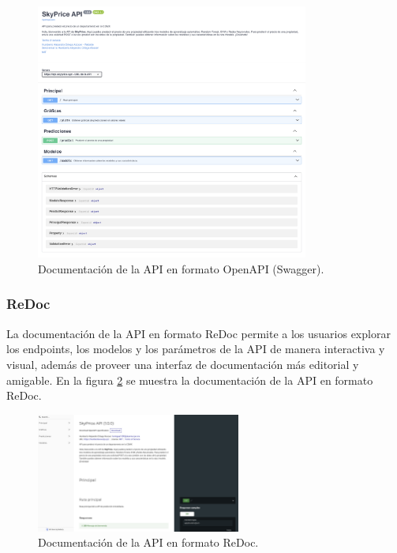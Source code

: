 \begin{figure}[H]
    \centering
    \includegraphics[width=0.8\textwidth]{imagenes/05-implementacion/servicio-web/openapi.png}
    \caption{Documentación de la API en formato OpenAPI (Swagger).}
    \label{fig:skyprice-openapi}
\end{figure}

\subsubsection{ReDoc}
La documentación de la API en formato ReDoc permite a los usuarios explorar los
endpoints, los modelos y los parámetros de la API de manera interactiva y visual,
además de proveer una interfaz de documentación más editorial y amigable. En la
figura \ref{fig:skyprice-redoc} se muestra la documentación de la API en formato
ReDoc.

\begin{figure}[H]
    \centering
    \includegraphics[width=0.6\textwidth]{imagenes/05-implementacion/servicio-web/redoc.png}
    \caption{Documentación de la API en formato ReDoc.}
    \label{fig:skyprice-redoc}
\end{figure}


